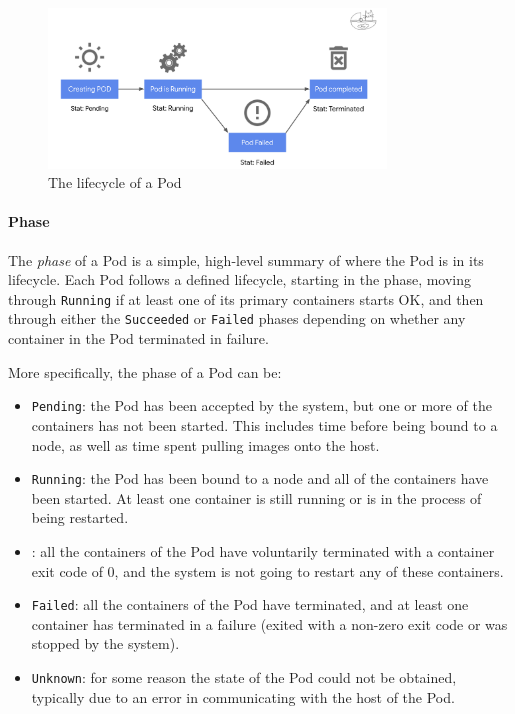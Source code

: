 \begin{figure}[ht]
	\centering
	\includegraphics[width=0.8\textwidth]{resources/Pod-lifecycle.png}
	\caption{The lifecycle of a Pod}
\end{figure}

\paragraph*{Phase}
The \textit{phase} of a Pod is a simple, high-level summary of where the Pod is
in its lifecycle. Each Pod follows a defined lifecycle, starting in the
 phase, moving through \texttt{Running} if at least one of its
primary containers starts OK, and then through either the \texttt{Succeeded} or
\texttt{Failed} phases depending on whether any container in the Pod terminated
in failure.

More specifically, the phase of a Pod can be:

\begin{itemize}
	\tightlist
	\item
	      \texttt{Pending}: the Pod has been accepted by the system, but one or
	      more of the containers has not been started. This includes time before
	      being bound to a node, as well as time spent pulling images onto the
	      host.
	\item
	      \texttt{Running}: the Pod has been bound to a node and all of the
	      containers have been started. At least one container is still running
	      or is in the process of being restarted.
	\item
	      : all the containers of the Pod have voluntarily
	      terminated with a container exit code of 0, and the system is not
	      going to restart any of these containers.
	\item
	      \texttt{Failed}: all the containers of the Pod have terminated, and at
	      least one container has terminated in a failure (exited with a
	      non-zero exit code or was stopped by the system).
	\item
	      \texttt{Unknown}: for some reason the state of the Pod could not be
	      obtained, typically due to an error in communicating with the host of
	      the Pod.
\end{itemize}

